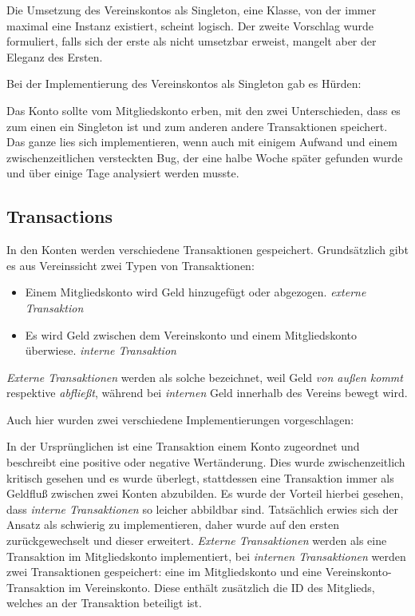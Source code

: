 \documentclass[a4paper, 11pt]{article}
\begin{document}
Die Umsetzung des Vereinskontos als Singleton, eine Klasse, von der immer
maximal eine Instanz existiert, scheint logisch. Der zweite Vorschlag wurde
formuliert, falls sich der erste als nicht umsetzbar erweist, mangelt aber der
Eleganz des Ersten.

Bei der Implementierung des Vereinskontos als Singleton gab es Hürden:

Das Konto sollte vom Mitgliedskonto erben, mit den zwei Unterschieden, dass es
zum einen ein Singleton ist und zum anderen andere Transaktionen speichert. Das
ganze lies sich implementieren, wenn auch mit einigem Aufwand und einem
zwischenzeitlichen versteckten Bug, der eine halbe Woche später gefunden wurde
und über einige Tage analysiert werden musste. 

\subsection{Transactions}

In den Konten werden verschiedene Transaktionen gespeichert. Grundsätzlich gibt es aus Vereinssicht zwei Typen von Transaktionen:

\begin{itemize}
    \item Einem Mitgliedskonto wird Geld hinzugefügt oder abgezogen. \emph{externe Transaktion}
    \item Es wird Geld zwischen dem Vereinskonto und einem Mitgliedskonto überwiese. \emph{interne Transaktion}
\end{itemize}

\emph{Externe Transaktionen} werden als solche bezeichnet, weil Geld \emph{von
außen kommt} respektive \emph{abfließt}, während bei \emph{internen} Geld
innerhalb des Vereins bewegt wird.

Auch hier wurden zwei verschiedene Implementierungen vorgeschlagen:

In der Ursprünglichen ist eine Transaktion einem Konto zugeordnet und
beschreibt eine positive oder negative Wertänderung. Dies wurde
zwischenzeitlich kritisch gesehen und es wurde überlegt, stattdessen eine
Transaktion immer als Geldfluß zwischen zwei Konten abzubilden. Es wurde der
Vorteil hierbei gesehen, dass \emph{interne Transaktionen} so leicher abbildbar
sind. Tatsächlich erwies sich der Ansatz als schwierig zu implementieren, daher
wurde auf den ersten zurückgewechselt und dieser erweitert. \emph{Externe
Transaktionen} werden als eine Transaktion im Mitgliedskonto implementiert, bei
\emph{internen Transaktionen} werden zwei Transaktionen gespeichert: eine im
Mitgliedskonto und eine Vereinskonto-Transaktion im Vereinskonto. Diese enthält
zusätzlich die ID des Mitglieds, welches an der Transaktion beteiligt ist.
\end{document}
